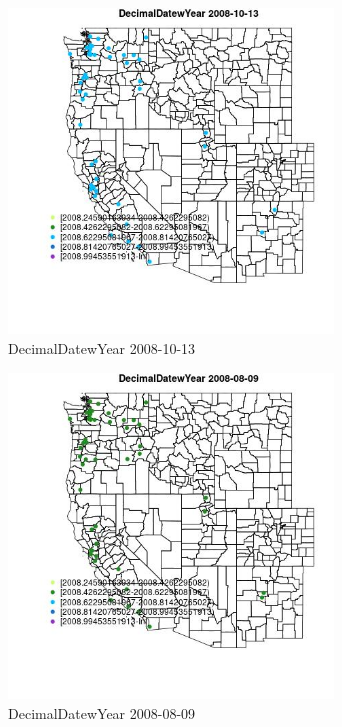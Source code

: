 \begin{figure} 
\centering  
\includegraphics[width=0.77\textwidth]{Code_Outputs/Report_ML_input_PM25_Step4_part_e_de_duplicated_aves_MapObsDecimalDatewYear2008-10-13.jpg} 
\caption{\label{fig:Report_ML_input_PM25_Step4_part_e_de_duplicated_avesMapObsDecimalDatewYear2008-10-13}DecimalDatewYear 2008-10-13} 
\end{figure} 
 

\begin{figure} 
\centering  
\includegraphics[width=0.77\textwidth]{Code_Outputs/Report_ML_input_PM25_Step4_part_e_de_duplicated_aves_MapObsDecimalDatewYear2008-08-09.jpg} 
\caption{\label{fig:Report_ML_input_PM25_Step4_part_e_de_duplicated_avesMapObsDecimalDatewYear2008-08-09}DecimalDatewYear 2008-08-09} 
\end{figure} 
 

